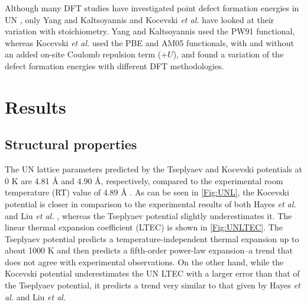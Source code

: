 \documentclass[preprint, 12pt]{elsarticle}
\begin{document}
Although many DFT studies have investigated point defect formation energies in UN \cite{Kotomin2007, Bocharov2011, Lan2013, Kuksin2016, Tseplyaev2016, Kocevski2022II}, only Yang and Kaltsoyannis \cite{Yang2021} and Kocevski \textit{et al.} \cite{Kocevski2022I} have looked at their variation with stoichiometry. Yang and Kaltsoyannis used the PW91 functional, whereas Kocevski \textit{et al.} used the PBE and AM05 functionals, with and without an added on-site Coulomb repulsion term ($+U$), and found a variation of the defect formation energies with different DFT methodologies.

\section{Results}

\subsection{Structural properties}

The UN lattice parameters predicted by the Tseplyaev and Kocevski potentials at 0 K are 4.81 {\AA} and 4.90 {\AA}, respectively, compared to the experimental room temperature (RT) value of 4.89 {\AA} \cite{Hayes1990I}. As can be seen in \cref{Fig:UNL}, the Kocevski potential is closer in comparison to the experimental results of both Hayes \textit{et al.} \cite{Hayes1990I} and Liu \textit{et al.} \cite{Liu2023}, whereas the Tseplyaev potential slightly underestimates it. The linear thermal expansion coefficient (LTEC) is shown in \cref{Fig:UNLTEC}. The Tseplyaev potential predicts a temperature-independent thermal expansion up to about 1000 K and then predicts a fifth-order power-law expansion--a trend that does not agree with experimental observations. On the other hand, while the Kocevski potential underestimates the UN LTEC with a larger error than that of the Tseplyaev potential, it predicts a trend very similar to that given by Hayes \textit{et al.} and Liu \textit{et al.}
\end{document}
